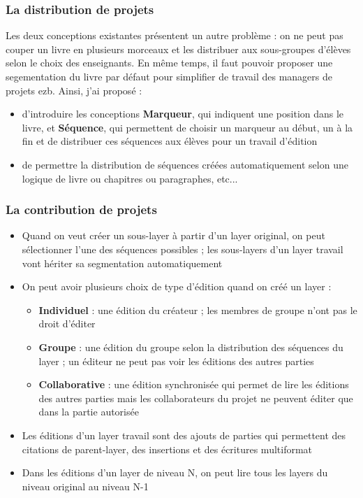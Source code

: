 \subsubsection{La distribution de projets}

Les deux conceptions existantes présentent un autre problème : on ne peut pas couper un livre en plusieurs morceaux et les distribuer aux sous-groupes d'élèves selon le choix des enseignants. En même temps, il faut pouvoir proposer une segementation du livre par défaut pour simplifier de travail des managers de projets ezb. Ainsi, j'ai proposé :

\begin{itemize}
    \item d'introduire les conceptions \textbf{Marqueur}, qui indiquent une position dans le livre, et \textbf{Séquence}, qui permettent de choisir un marqueur au début, un à la fin et de distribuer ces séquences aux élèves pour un travail d'édition
    \item de permettre la distribution de séquences créées automatiquement selon une logique de livre ou chapitres ou paragraphes, etc...
\end{itemize}

\subsubsection{La contribution de projets}

\begin{itemize}
    \item Quand on veut créer un sous-layer à partir d'un layer original, on peut sélectionner l'une des séquences possibles ; les sous-layers d'un layer travail vont hériter sa segmentation automatiquement
    \item On peut avoir plusieurs choix de type d'édition quand on créé un layer :
            \begin{itemize}
                \item \textbf{Individuel} : une édition du créateur ; les membres de groupe n'ont pas le droit d'éditer
                \item \textbf{Groupe} : une édition du groupe selon la distribution des séquences du layer ; un éditeur ne peut pas voir les éditions des autres parties
                \item \textbf{Collaborative} : une édition synchronisée qui permet de lire les éditions des autres parties mais les collaborateurs du projet ne peuvent éditer que dans la partie autorisée
            \end{itemize}
    \item Les éditions d'un layer travail sont des ajouts de parties qui permettent des citations de parent-layer, des insertions et des écritures multiformat
    \item Dans les éditions d'un layer de niveau N, on peut lire tous les layers du niveau original au niveau N-1
\end{itemize}

